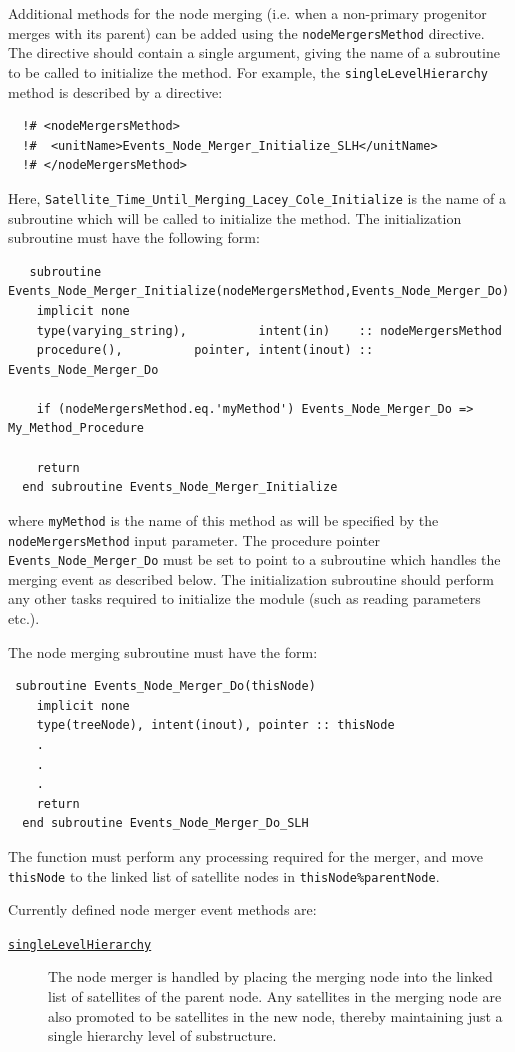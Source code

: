Additional methods for the node merging (i.e. when a non-primary progenitor merges with its parent) can be added using the {\tt nodeMergersMethod} directive. The directive should contain a single argument, giving the name of a subroutine to be called to initialize the method. For example, the {\tt singleLevelHierarchy} method is described by a directive:
\begin{verbatim}
  !# <nodeMergersMethod>
  !#  <unitName>Events_Node_Merger_Initialize_SLH</unitName>
  !# </nodeMergersMethod>
\end{verbatim}
Here, {\tt Satellite\_Time\_Until\_Merging\_Lacey\_Cole\_Initialize} is the name of a subroutine which will be called to initialize the method. The initialization subroutine must have the following form:
\begin{verbatim}
   subroutine Events_Node_Merger_Initialize(nodeMergersMethod,Events_Node_Merger_Do)
    implicit none
    type(varying_string),          intent(in)    :: nodeMergersMethod
    procedure(),          pointer, intent(inout) :: Events_Node_Merger_Do

    if (nodeMergersMethod.eq.'myMethod') Events_Node_Merger_Do => My_Method_Procedure

    return
  end subroutine Events_Node_Merger_Initialize
\end{verbatim}
where {\tt myMethod} is the name of this method as will be specified by the {\tt nodeMergersMethod} input parameter. The procedure pointer {\tt Events\_Node\_Merger\_Do} must be set to point to a subroutine which handles the merging event as described below. The initialization subroutine should perform any other tasks required to initialize the module (such as reading parameters etc.).

The node merging subroutine must have the form:
\begin{verbatim}
 subroutine Events_Node_Merger_Do(thisNode)
    implicit none
    type(treeNode), intent(inout), pointer :: thisNode
    .
    .
    .
    return
  end subroutine Events_Node_Merger_Do_SLH
\end{verbatim}
The function must perform any processing required for the merger, and move {\tt thisNode} to the linked list of satellite nodes in {\tt thisNode\%parentNode}.

Currently defined node merger event methods are:
\begin{description}
 \item [\hyperlink{events.node_merger.single_level_hierarchy.F90:events_node_mergers_slh:events_node_merger_do_slh}{{\tt singleLevelHierarchy}}] The node merger is handled by placing the merging node into the linked list of satellites of the parent node. Any satellites in the merging node are also promoted to be satellites in the new node, thereby maintaining just a single hierarchy level of substructure.
\end{description}

